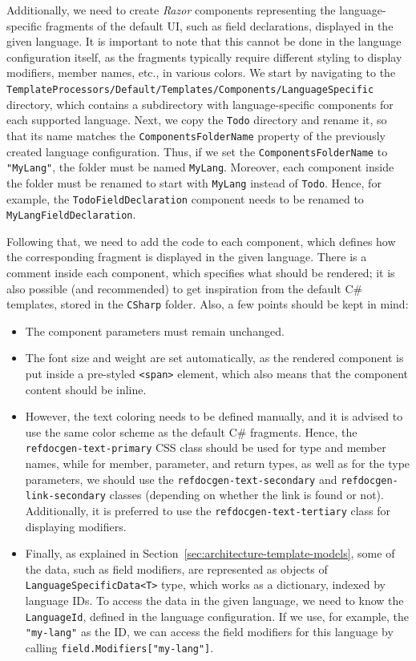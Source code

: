 Additionally, we need to create \textit{Razor} components representing the language-specific fragments of the default UI, such as field declarations, displayed in the given language.
It is important to note that this cannot be done in the language configuration itself, as the fragments typically require different styling to display modifiers, member names, etc., in various colors.
We start by navigating to the \texttt{TemplateProcessors/Default/Templates/Components/LanguageSpecific} directory, which contains a subdirectory with language-specific components for each supported language.
Next, we copy the \texttt{Todo} directory and rename it, so that its name matches the \texttt{ComponentsFolderName} property of the previously created language configuration.
Thus, if we set the \texttt{ComponentsFolderName} to \texttt{"MyLang"}, the folder must be named \texttt{MyLang}.
Moreover, each component inside the folder must be renamed to start with \texttt{MyLang} instead of \texttt{Todo}.
Hence, for example, the \texttt{TodoFieldDeclaration} component needs to be renamed to \texttt{MyLangFieldDeclaration}.

Following that, we need to add the code to each component, which defines how the corresponding fragment is displayed in the given language.
There is a comment inside each component, which specifies what should be rendered; it is also possible 
(and recommended) to get inspiration from the default C\# templates, stored in the \texttt{CSharp} folder.
Also, a few points should be kept in mind:

\begin{itemize}
    \item The component parameters must remain unchanged.
    \item The font size and weight are set automatically, as the rendered component is put inside a pre-styled \texttt{<span>} element, which also means that the component content should be inline.
    \item However, the text coloring needs to be defined manually, and
it is advised to use the same color scheme as the default C\# fragments. 
Hence, the \texttt{refdocgen-text-primary} CSS class should be used for type and member names, while
for member, parameter, and return types, as well as for the type parameters, we should use the \texttt{refdocgen-text-secondary} and \texttt{refdocgen-link-secondary} classes (depending on whether the link is found or not).
Additionally, it is preferred to use the \texttt{refdocgen-text-tertiary} class for displaying modifiers.
    \item Finally, as explained in Section~\ref{sec:architecture-template-models}, some of the data, such as field modifiers, are represented as objects of \texttt{LanguageSpecificData<T>} type, 
which works as a dictionary, indexed by language IDs.
To access the data in the given language, we need to know the \texttt{LanguageId}, defined in the language configuration.
If we use, for example, the \texttt{"my-lang"} as the ID, we can access the field modifiers for this language by calling \texttt{field.Modifiers["my-lang"]}.
\end{itemize}

